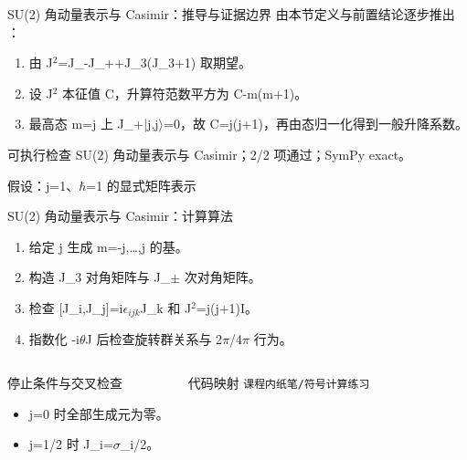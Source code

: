 \begin{frame}[t]{SU(2) 角动量表示与 Casimir：推导与证据边界}
\footnotesize
{}\quad 由本节定义与前置结论逐步推出 ：
\begin{enumerate}
\item 由 J\ensuremath{^{2}}=J\_-J\_++J\_3(J\_3+1) 取期望。
\item 设 J\ensuremath{^{2}} 本征值 C，升算符范数平方为 C-m(m+1)。
\item 最高态 m=j 上 J\_+|j,j\ensuremath{\rangle}=0，故 C=j(j+1)，再由态归一化得到一般升降系数。
\end{enumerate}\begin{block}{可执行检查}
\quad SU(2) 角动量表示与 Casimir；2/2 项通过；SymPy exact。
\par\scriptsize 假设：j=1、\ensuremath{\hbar}=1 的显式矩阵表示
\end{block}
\end{frame}

\begin{frame}[t]{SU(2) 角动量表示与 Casimir：计算算法}
\footnotesize
{}\begin{enumerate}
\item 给定 j 生成 m=-j,…,j 的基。
\item 构造 J\_3 对角矩阵与 J\_\ensuremath{\pm} 次对角矩阵。
\item 检查 [J\_i,J\_j]=i\ensuremath{\epsilon}\ensuremath{_{ijk}}J\_k 和 J\ensuremath{^{2}}=j(j+1)I。
\item 指数化 -i\ensuremath{\theta}J 后检查旋转群关系与 2\ensuremath{\pi}/\allowbreak{}4\ensuremath{\pi} 行为。
\end{enumerate}\begin{columns}[T,onlytextwidth]
\begin{block}{停止条件与交叉检查}\scriptsize\begin{itemize}
\item[\CheckMark] j=0 时全部生成元为零。
\item[\CheckMark] j=1/\allowbreak{}2 时 J\_i=\ensuremath{\sigma}\_i/\allowbreak{}2。
\end{itemize}\end{block}
\begin{block}{代码映射}
\scriptsize \texttt{课程内纸笔/\allowbreak{}符号计算练习}
\end{block}\end{columns}\end{frame}

